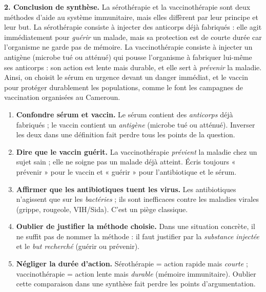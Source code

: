 \documentclass[11pt]{article}
\begin{document}
\begin{exoresolu}
\textbf{2. Conclusion de synthèse.} La sérothérapie et la vaccinothérapie sont deux méthodes d'aide au système immunitaire, mais elles diffèrent par leur principe et leur but. La sérothérapie consiste à injecter des anticorps déjà fabriqués : elle agit immédiatement pour \emph{guérir} un malade, mais sa protection est de courte durée car l'organisme ne garde pas de mémoire. La vaccinothérapie consiste à injecter un antigène (microbe tué ou atténué) qui pousse l'organisme à fabriquer lui-même ses anticorps : son action est lente mais durable, et elle sert à \emph{prévenir} la maladie. Ainsi, on choisit le sérum en urgence devant un danger immédiat, et le vaccin pour protéger durablement les populations, comme le font les campagnes de vaccination organisées au Cameroun.
\end{exoresolu}

\begin{attention}
\begin{enumerate}
\item \textbf{Confondre sérum et vaccin.} Le sérum contient des \emph{anticorps} déjà fabriqués ; le vaccin contient un \emph{antigène} (microbe tué ou atténué). Inverser les deux dans une définition fait perdre tous les points de la question.
\item \textbf{Dire que le vaccin guérit.} La vaccinothérapie \emph{prévient} la maladie chez un sujet sain ; elle ne soigne pas un malade déjà atteint. Écris toujours « prévenir » pour le vaccin et « guérir » pour l'antibiotique et le sérum.
\item \textbf{Affirmer que les antibiotiques tuent les virus.} Les antibiotiques n'agissent que sur les \emph{bactéries} ; ils sont inefficaces contre les maladies virales (grippe, rougeole, VIH/Sida). C'est un piège classique.
\item \textbf{Oublier de justifier la méthode choisie.} Dans une situation concrète, il ne suffit pas de nommer la méthode : il faut justifier par la \emph{substance injectée} et le \emph{but recherché} (guérir ou prévenir).
\item \textbf{Négliger la durée d'action.} Sérothérapie = action rapide mais \emph{courte} ; vaccinothérapie = action lente mais \emph{durable} (mémoire immunitaire). Oublier cette comparaison dans une synthèse fait perdre les points d'argumentation.
\end{enumerate}
\end{attention}

\newpage
\end{document}
